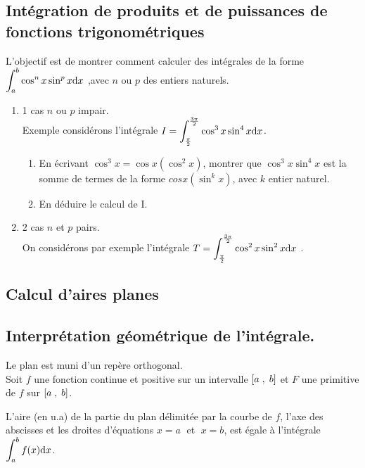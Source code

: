 \subsection*{Intégration de produits et de puissances de fonctions trigonométriques}
 L'objectif est de montrer comment calculer des intégrales de la forme\\
 $ \displaystyle \int_{a}^{b}\cos^{n}x \sin^{p}x {\rm d}x $ ,avec $ n $ ou  $ p $  des entiers naturels.
 
\begin{enumerate}
\item 1 cas $ n $ ou  $ p $  impair.\\
Exemple considérons  l'intégrale $ I =  \displaystyle \int_{\frac{\pi}{2}}^{\frac{3\pi}{2}}\cos^{3}x \sin^{4}x {\rm d}x $.
\begin{enumerate}

\item En écrivant $ \cos ^{3}x= \cos x(\cos ^{2}x) $, montrer que $\cos^{3}x \sin^{4}x  $ est la somme de termes de la forme  $ cosx (\sin^{k}x ) $, avec  $ k $ entier naturel.
\item En déduire le calcul de I. 
 \end{enumerate}
 \item 2 cas $ n $ et $ p $  pairs.\\
 On considérons  par exemple l'intégrale $ T =  \displaystyle \int_{\frac{\pi}{2}}^{\frac{3\pi}{2}}\cos^{2}x \sin^{2}x {\rm d}x $ . 
\end{enumerate}


\subsection{Calcul d'aires planes}
\subsection*{Interprétation géométrique de l'intégrale.}
 \begin{theorem}[admis]
 Le  plan est  muni d'un repère orthogonal.\\ Soit $f$ une fonction continue et positive sur un intervalle $ \left[a\;,\; b\right] $  et  $F$ une primitive de $f$ sur $ \left[a\;,\; b\right] $.
 
  L'aire (en u.a) de la partie du plan délimitée par la courbe de $f$, l'axe des abscisses et les droites d'équations $ x=a\;$ et $ \;x=b$, est égale à l'intégrale  $ \displaystyle\int_{a}^{b}f(x){\rm d}x $.
\end{theorem}
\hspace*{1cm}

